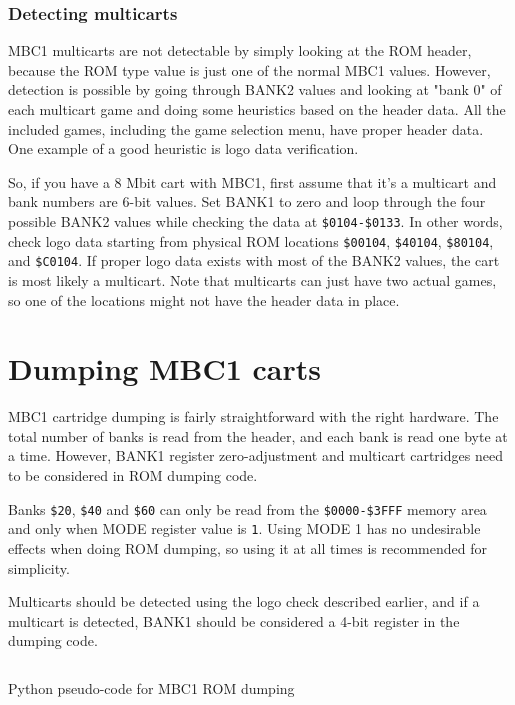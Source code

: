 \subsubsection{Detecting multicarts}

MBC1 multicarts are not detectable by simply looking at the ROM header, because
the ROM type value is just one of the normal MBC1 values. However, detection is
possible by going through BANK2 values and looking at "bank 0" of each
multicart game and doing some heuristics based on the header data. All the
included games, including the game selection menu, have proper header data.
One example of a good heuristic is logo data verification.

So, if you have a 8 Mbit cart with MBC1, first assume that it's a multicart and
bank numbers are 6-bit values. Set BANK1 to zero and loop through the four
possible BANK2 values while checking the data at \texttt{\$0104-\$0133}.  In
other words, check logo data starting from physical ROM locations
\texttt{\$00104}, \texttt{\$40104}, \texttt{\$80104}, and \texttt{\$C0104}.  If
proper logo data exists with most of the BANK2 values, the cart is most likely
a multicart. Note that multicarts can just have two actual games, so one of the
locations might not have the header data in place.

\section{Dumping MBC1 carts}

MBC1 cartridge dumping is fairly straightforward with the right hardware. The
total number of banks is read from the header, and each bank is read one byte
at a time. However, BANK1 register zero-adjustment and multicart cartridges
need to be considered in ROM dumping code.

Banks \texttt{\$20}, \texttt{\$40} and \texttt{\$60} can only be read from the
\texttt{\$0000-\$3FFF} memory area and only when MODE register value is
\texttt{1}. Using MODE 1 has no undesirable effects when doing ROM dumping, so
using it at all times is recommended for simplicity.

Multicarts should be detected using the logo check described earlier, and if a
multicart is detected, BANK1 should be considered a 4-bit register in the
dumping code.

\begin{listing}[H]
  \inputminted[frame=lines]{python}{code-snippets/mbc1_dump.py}
  \caption{Python pseudo-code for MBC1 ROM dumping}
\end{listing}
